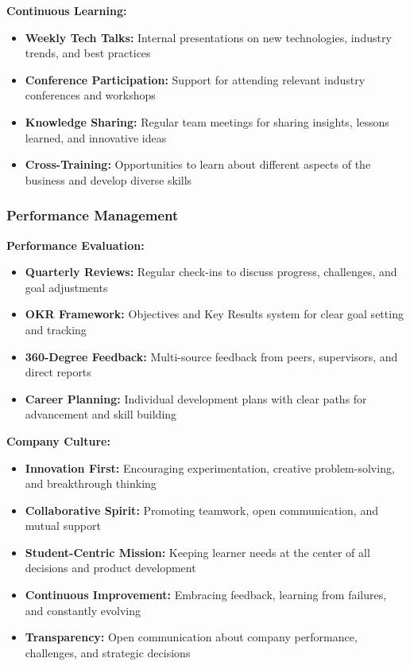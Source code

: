 \textbf{Continuous Learning:}
\begin{itemize}
    \item \textbf{Weekly Tech Talks:} Internal presentations on new technologies, industry trends, and best practices
    \item \textbf{Conference Participation:} Support for attending relevant industry conferences and workshops
    \item \textbf{Knowledge Sharing:} Regular team meetings for sharing insights, lessons learned, and innovative ideas
    \item \textbf{Cross-Training:} Opportunities to learn about different aspects of the business and develop diverse skills
\end{itemize}

\subsubsection{Performance Management}
\textbf{Performance Evaluation:}
\begin{itemize}
    \item \textbf{Quarterly Reviews:} Regular check-ins to discuss progress, challenges, and goal adjustments
    \item \textbf{OKR Framework:} Objectives and Key Results system for clear goal setting and tracking
    \item \textbf{360-Degree Feedback:} Multi-source feedback from peers, supervisors, and direct reports
    \item \textbf{Career Planning:} Individual development plans with clear paths for advancement and skill building
\end{itemize}

\textbf{Company Culture:}
\begin{itemize}
    \item \textbf{Innovation First:} Encouraging experimentation, creative problem-solving, and breakthrough thinking
    \item \textbf{Collaborative Spirit:} Promoting teamwork, open communication, and mutual support
    \item \textbf{Student-Centric Mission:} Keeping learner needs at the center of all decisions and product development
    \item \textbf{Continuous Improvement:} Embracing feedback, learning from failures, and constantly evolving
    \item \textbf{Transparency:} Open communication about company performance, challenges, and strategic decisions
\end{itemize}